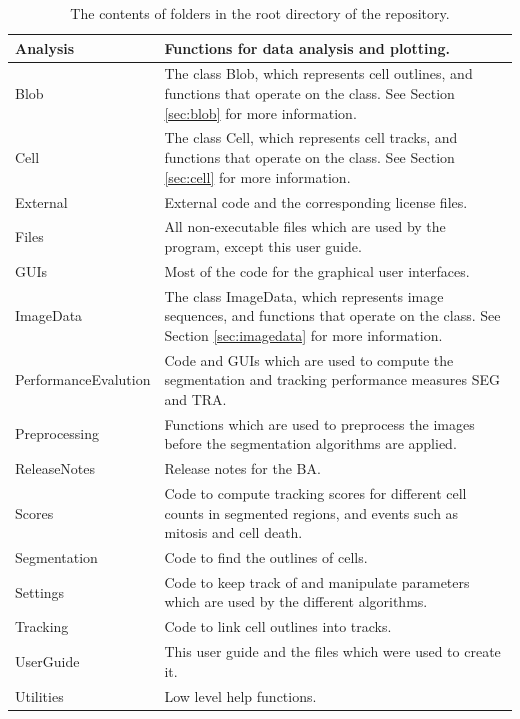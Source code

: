 \documentclass[a4paper, oneside, onecolumn, 11pt]{article}
\begin{document}
\begin{table}[!htbp]
\caption{The contents of folders in the root directory of the repository.}
\label{tab:folders}
\begin{tabularx}{\textwidth}{lX}
\hline
Analysis &  Functions for data analysis and plotting.\\[5pt] \hline

Blob & The class Blob, which represents cell outlines, and functions that operate on the class. See Section \ref{sec:blob} for more information.\\[5pt] \hline

Cell &  The class Cell, which represents cell tracks, and functions that operate on the class. See Section \ref{sec:cell} for more information.\\[5pt] \hline

External & External code and the corresponding license files.\\[5pt] \hline

Files & All non-executable files which are used by the program, except this user guide.\\[5pt] \hline

GUIs & Most of the code for the graphical user interfaces.\\[5pt] \hline

ImageData & The class ImageData, which represents image sequences, and functions that operate on the class. See Section \ref{sec:imagedata} for more information.\\[5pt] \hline

PerformanceEvalution & Code and GUIs which are used to compute the segmentation and tracking performance measures SEG and TRA.\\[5pt] \hline

Preprocessing & Functions which are used to preprocess the images before the segmentation algorithms are applied.\\[5pt] \hline

ReleaseNotes & Release notes for the BA.\\[5pt] \hline

Scores & Code to compute tracking scores for different cell counts in segmented regions, and events such as mitosis and cell death.\\[5pt] \hline

Segmentation & Code to find the outlines of cells.\\[5pt] \hline

Settings & Code to keep track of and manipulate parameters which are used by the different algorithms.\\[5pt] \hline

Tracking & Code to link cell outlines into tracks.\\[5pt] \hline

UserGuide & This user guide and the files which were used to create it.\\[5pt] \hline

Utilities & Low level help functions.\\[5pt] \hline
\end{tabularx}
\end{table}
\end{document}
